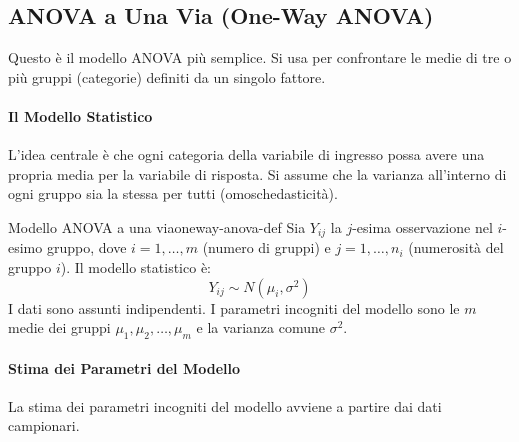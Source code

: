 \subsection{ANOVA a Una Via (One-Way ANOVA)}
Questo è il modello ANOVA più semplice. Si usa per confrontare le medie di tre
o più gruppi (categorie) definiti da un singolo fattore.

\paragraph{Il Modello Statistico}
L'idea centrale è che ogni categoria della variabile di ingresso possa avere
una propria media per la variabile di risposta. Si assume che la varianza
all'interno di ogni gruppo sia la stessa per tutti (omoschedasticità).

\begin{definizione}{Modello ANOVA a una via}{oneway-anova-def}
Sia \(Y_{ij}\) la \(j\)-esima osservazione nel \(i\)-esimo gruppo, dove \(i=1,
\dots, m\) (numero di gruppi) e \(j=1, \dots, n_i\) (numerosità del gruppo
\(i\)). Il modello statistico è:
\[ Y_{ij} \sim N(\mu_i, \sigma^2) \]
I dati sono assunti indipendenti. I parametri incogniti del modello sono le
\(m\) medie dei gruppi \(\mu_1, \mu_2, \dots, \mu_m\) e la varianza comune
\(\sigma^2\).
\end{definizione}

\paragraph{Stima dei Parametri del Modello}
La stima dei parametri incogniti del modello avviene a partire dai dati
campionari.


